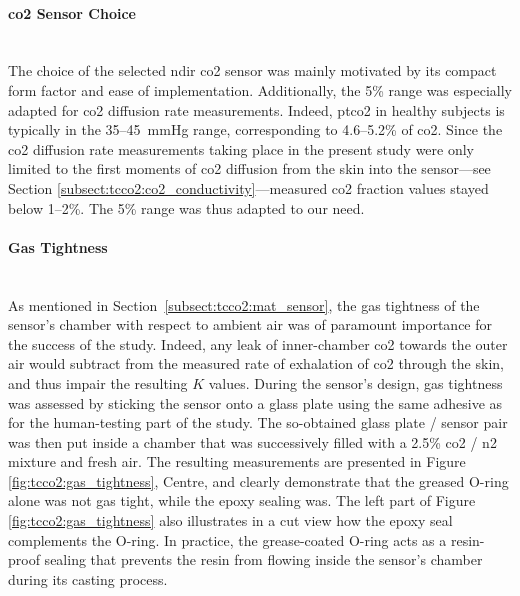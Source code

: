 \paragraph{\texorpdfstring{\gls{co2}}{CO2} Sensor Choice}\makebox{}\\

The choice of the selected \gls{ndir} \gls{co2} sensor was mainly motivated by its compact form factor and ease of implementation. Additionally, the 5\% range was especially adapted for \gls{co2} diffusion rate measurements. Indeed, \gls{ptco2} in healthy subjects is typically in the 35--45~mmHg range\cite{rithalia1984}, corresponding to 4.6--5.2\% of \gls{co2}. Since the \gls{co2} diffusion rate measurements taking place in the present study were only limited to the first moments of \gls{co2} diffusion from the skin into the sensor---see Section \ref{subsect:tcco2:co2_conductivity}---measured \gls{co2} fraction values stayed below 1--2\%. The 5\% range was thus adapted to our need.

\paragraph{Gas Tightness}\label{subsect:tcco2:gas_tightness}\makebox{}\\

As mentioned in Section~\ref{subsect:tcco2:mat_sensor}, the gas tightness of the sensor's chamber with respect to ambient air was of paramount importance for the success of the study. Indeed, any leak of inner-chamber \gls{co2} towards the outer air would subtract from the measured rate of exhalation of \gls{co2} through the skin, and thus impair the resulting $K$ values. During the sensor's design, gas tightness was assessed by sticking the sensor onto a glass plate using the same adhesive as for the human-testing part of the study. The so-obtained glass plate / sensor pair was then put inside a chamber that was successively filled with a 2.5\% \gls{co2} / \gls{n2} mixture and fresh air. The resulting measurements are presented in Figure \ref{fig:tcco2:gas_tightness}, Centre, and clearly demonstrate that the greased O-ring alone was not gas tight, while the epoxy sealing was. The left part of Figure \ref{fig:tcco2:gas_tightness} also illustrates in a cut view how the epoxy seal complements the O-ring. In practice, the grease-coated O-ring acts as a resin-proof sealing that prevents the resin from flowing inside the sensor's chamber during its casting process.

